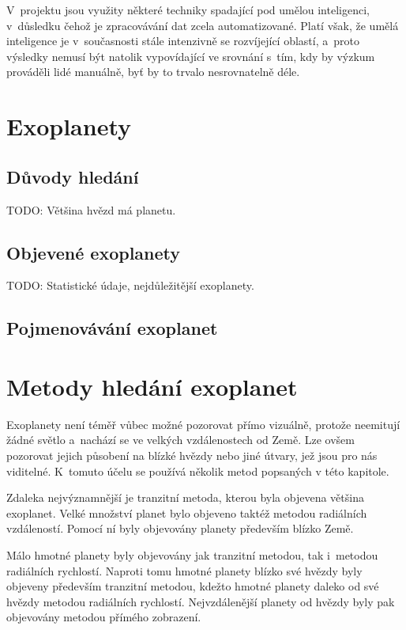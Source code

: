 \documentclass[a4paper,12pt]{article}
\begin{document}
V~projektu jsou využity některé techniky spadající pod umělou inteligenci, v~důsledku čehož je zpracovávání dat zcela automatizované. Platí však, že umělá inteligence je v~současnosti stále intenzivně se rozvíjející oblastí, a~proto výsledky nemusí být natolik vypovídající ve srovnání s~tím, kdy by výzkum prováděli lidé manuálně, byť by to trvalo nesrovnatelně déle.

\section{Exoplanety}
\subsection{Důvody hledání}

TODO: Většina hvězd má planetu.

\subsection{Objevené exoplanety}

TODO: Statistické údaje, nejdůležitější exoplanety.

\subsection{Pojmenovávání exoplanet}

\section{Metody hledání exoplanet}

Exoplanety není téměř vůbec možné pozorovat přímo vizuálně, protože neemitují žádné světlo a~nachází se ve velkých vzdálenostech od Země. Lze ovšem pozorovat jejich působení na blízké hvězdy nebo jiné útvary, jež jsou pro nás viditelné. K~tomuto účelu se používá několik metod popsaných v této kapitole.

Zdaleka nejvýznamnější je tranzitní metoda, kterou byla objevena většina exoplanet. Velké množství planet bylo objeveno taktéž metodou radiálních vzdáleností. Pomocí ní byly objevovány planety především blízko Země.


\dataplot

Málo hmotné planety byly objevovány jak tranzitní metodou, tak i~metodou radiálních rychlostí. Naproti tomu hmotné planety blízko své hvězdy byly objeveny především tranzitní metodou, kdežto hmotné planety daleko od své hvězdy metodou radiálních rychlostí. Nejvzdálenější planety od hvězdy byly pak objevovány metodou přímého zobrazení.
\end{document}
